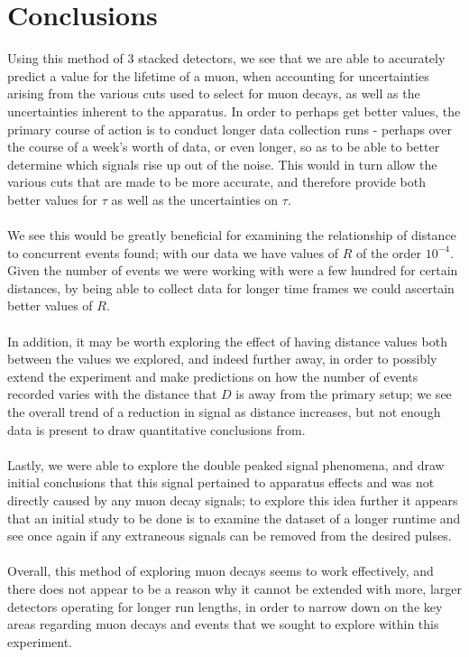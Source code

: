 \documentclass[a4paper]{article}
\begin{document}
\section{Conclusions}%
Using this method of 3 stacked detectors, we see that we are able to accurately predict a value for the lifetime of a muon, when accounting for uncertainties arising from the various cuts used to select for muon decays, as well as the uncertainties inherent to the apparatus.
In order to perhaps get better values, the primary course of action is to conduct longer data collection runs - perhaps over the course of a week's worth of data, or even longer, so as to be able to better determine which signals rise up out of the noise. This would in turn allow the various cuts that are made to be more accurate, and therefore provide both better values for $\tau$ as well as the uncertainties on $\tau$. 
\\\\
We see this would be greatly beneficial for examining the relationship of distance to concurrent events found; with our data we have values of $R$ of the order $10^{-4}$. Given the number of events we were working with were a few hundred for certain distances, by being able to collect data for longer time frames we could ascertain better values of $R$.
\\\\
In addition, it may be worth exploring the effect of having distance values both between the values we explored, and indeed further away, in order to possibly extend the experiment and make predictions on how the number of events recorded varies with the distance that $D$ is away from the primary setup; we see the overall trend of a reduction in signal as distance increases, but not enough data is present to draw quantitative conclusions from. 
\\\\
Lastly, we were able to explore the double peaked signal phenomena, and draw initial conclusions that this signal pertained to apparatus effects and was not directly caused by any muon decay signals; to explore this idea further it appears that an initial study to be done is to examine the dataset of a longer runtime and see once again if any extraneous signals can be removed from the desired pulses.
\\\\
Overall, this method of exploring muon decays seems to work effectively, and there does not appear to be a reason why it cannot be extended with more, larger detectors operating for longer run lengths, in order to narrow down on the key areas regarding muon decays and events that we sought to explore within this experiment.
\newpage
\nocite{*}
\printbibliography[heading=bibnumbered]

\end{document}
